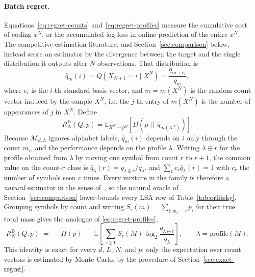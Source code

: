 \documentclass[11pt]{article}
\newcommand{\KL}{D}
\newcommand{\model}{\mathcal{M}_{d,L}}
\newcommand{\batchreg}{R^{\mathrm{B}}} %
\begin{document}
\paragraph{Batch regret.}
Equations~\eqref{eq:regret-counts} and~\eqref{eq:regret-profiles} measure the cumulative cost of coding $x^N$, or the accumulated log-loss in online prediction of the entire $x^N$. The
competitive-estimation literature, and Section~\ref{sec:comparison} below, instead
score an estimator by the divergence between the target and the single distribution
it outputs after $N$ observations.
That distribution is
\[
\hat q_m(i)
= Q(X_{N+1}=i\mid X^N)
= \frac{q_{m+e_i}}{q_m},
\]
where \(e_i\) is the \(i\)-th standard basis vector,
and \(m=m(X^N)\) is the random count vector induced by the sample
\(X^N\), i.e. the $j$-th entry of $m(X^N)$ is the number of appearances of $j$ in $X^N$. Define
\begin{equation}
\batchreg_N(Q,p)
=
\mathbb E_{X^N\sim p^N}
\left[
\KL\!\left(p\,\|\,\widehat q_{m(X^N)}\right)
\right].
\label{eq:batchdef}
\end{equation}
Because $\model$ ignores alphabet labels, $\hat q_m(i)$ depends on $i$ only through
the count $m_i$, and the performance depends on the profile $\lambda$.
Writing $\lambda \oplus r$ for the profile obtained from $\lambda$ by
moving one symbol from count $r$ to $r+1$, the common value on the count-$r$ class is
$\hat q_\lambda(r) = q_{\lambda \oplus r}/q_\lambda$, and $\sum_r c_r \hat
q_\lambda(r) = 1$ with $c_r$ the number of symbols seen $r$ times. Every mixture
in the family is therefore a \emph{natural} estimator in the sense
of~\cite{orlitsky2015competitive}, so the natural oracle of
Section~\ref{sec:comparison} lower-bounds every LSA row of
Table~\ref{tab:orlitsky}. Grouping symbols by count and
writing $S_r(m) = \sum_{i : m_i = r} p_i$ for their true total mass gives the analogue
of \eqref{eq:regret-profiles},
\begin{equation}
\batchreg_N(Q,p) \;=\; -H(p) \;-\; \mathbb{E}\!\left[\, \sum_{r \ge 0} S_r(M)\,
\log_2 \frac{q_{\lambda \oplus r}}{q_\lambda} \right],
\qquad \lambda = \mathrm{profile}(M).
\label{eq:batchexact}
\end{equation}
This identity is exact for every $d$, $L$, $N$, and $p$; only the
expectation over count vectors is estimated by Monte Carlo, by the
procedure of Section~\ref{sec:exact-regret}.
\end{document}
